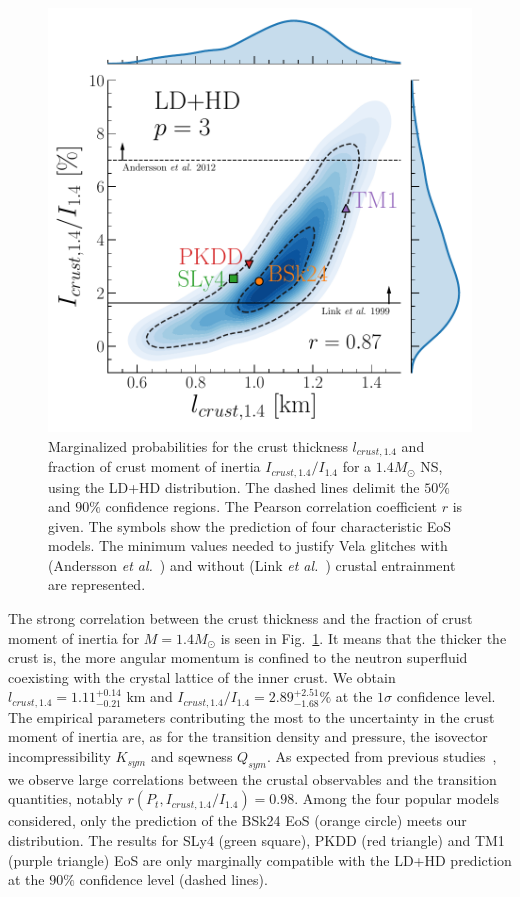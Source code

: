 \begin{figure}[!t]
  \begin{center}
    \includegraphics[width=0.8\linewidth]{figures/ifrac14_vs_lcrust14.pdf}
  \end{center}
  \caption[Marginalized probabilities for the crust thickness and fraction of
  crust moment of inertia of a $1.4M_\odot$]{Marginalized probabilities for the 
    crust thickness $l_{crust,1.4}$ and fraction of crust moment of inertia
    $I_{crust,1.4}/I_{1.4}$ for a $1.4M_\odot$ NS, using the LD+HD 
    distribution. The dashed lines delimit the $50\%$ and $90\%$ confidence 
    regions. The Pearson correlation coefficient $r$ is given. The symbols
    show the prediction of four characteristic EoS 
    models. The minimum values needed to justify Vela glitches with (Andersson 
    \textit{et al.}~\cite{Andersson2012}) and without (Link \textit{et
  al.}~\cite{Link1999}) crustal entrainment are 
represented.}\label{fig:ifrac14_vs_lcrust14}
\end{figure}

The strong correlation between the crust thickness and the fraction of crust 
moment of inertia for $M=1.4M_\odot$ is seen in
Fig.~\ref{fig:ifrac14_vs_lcrust14}. It means that the thicker the crust is, 
the more angular momentum is confined to the neutron superfluid coexisting with 
the crystal lattice of the inner crust. We obtain 
$l_{crust,1.4}=1.11_{-0.21}^{+0.14}$ km and $I_{crust,1.4}/I_{1.4}=
2.89_{-1.68}^{+2.51} \%$ at the $1\sigma$ confidence level. The empirical 
parameters contributing the most to the uncertainty in the crust moment of 
inertia are, as for the transition density and pressure, the isovector 
incompressibility $K_{sym}$ and sqewness $Q_{sym}$. As expected from previous 
studies~\cite{Piekarewicz2014,Carreau2019moi}, we observe large correlations 
between the crustal observables and the transition quantities, notably 
$r(P_t,I_{crust,1.4}/I_{1.4})=0.98$. Among the four popular models considered, 
only the prediction of the BSk24 EoS (orange circle) meets our distribution.
The results for SLy4 (green square), PKDD (red triangle) and TM1 (purple
triangle) EoS are only marginally compatible with the LD+HD prediction at the 
$90\%$ confidence level (dashed lines).

